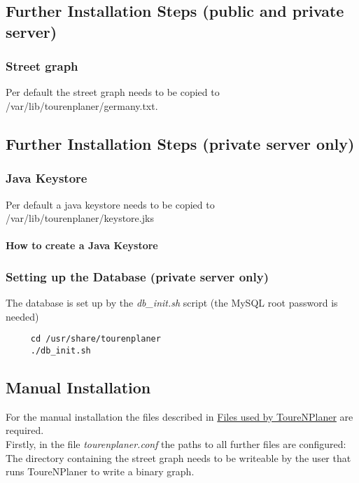 \documentclass[ngerman,titlepage,parskip=true]{scrartcl}
\begin{document}
	\subsection{Further Installation Steps  (public and private server)}
	\subsubsection{Street graph}
	 Per default the street graph needs to be copied to /var/lib/tourenplaner/germany.txt.
	\subsection{Further Installation Steps (private server only)}
	 \subsubsection{Java Keystore}
	 Per default a java keystore needs to be copied to /var/lib/tourenplaner/keystore.jks
	 \paragraph{How to create a Java Keystore}
	\subsubsection{Setting up the Database (private server only)}
	The database is set up by the \textit{db\_init.sh} script (the MySQL root password is needed)
   \begin{lstlisting}
	 cd /usr/share/tourenplaner
	 ./db_init.sh
	\end{lstlisting}
	
  \subsection{Manual Installation}
	For the manual installation the files described in \hyperref[usedfiles]{Files used by ToureNPlaner} are required.\\
	Firstly, in the file \textit{tourenplaner.conf} the paths to all further files are configured: The directory containing the street graph needs to be writeable by the user that runs ToureNPlaner to write a binary graph.
\end{document}
